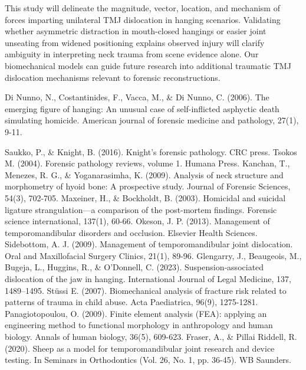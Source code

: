 \documentclass{article}
\begin{document}
This study will delineate the magnitude, vector, location, and mechanism of forces imparting unilateral TMJ dislocation in hanging scenarios. Validating whether asymmetric distraction in mouth-closed hangings or easier joint unseating from widened positioning explains observed injury will clarify ambiguity in interpreting neck trauma from scene evidence alone. Our biomechanical models can guide future research into additional traumatic TMJ dislocation mechanisms relevant to forensic reconstructions.

\clearpage


%

\begin{thebibliography}{10}
Di Nunno, N., Costantinides, F., Vacca, M., \& Di Nunno, C. (2006). The emerging figure of hanging: An unusual case of self-inflicted asphyctic death simulating homicide. American journal of forensic medicine and pathology, 27(1), 9-11.

Saukko, P., \& Knight, B. (2016). Knight's forensic pathology. CRC press.
Tsokos M. (2004). Forensic pathology reviews, volume 1. Humana Press.
Kanchan, T., Menezes, R. G., \& Yoganarasimha, K. (2009). Analysis of neck structure and morphometry of hyoid bone: A prospective study. Journal of Forensic Sciences, 54(3), 702-705.
Maxeiner, H., \& Bockholdt, B. (2003). Homicidal and suicidal ligature strangulation—a comparison of the post-mortem findings. Forensic science international, 137(1), 60-66.
Okeson, J. P. (2013). Management of temporomandibular disorders and occlusion. Elsevier Health Sciences.
Sidebottom, A. J. (2009). Management of temporomandibular joint dislocation. Oral and Maxillofacial Surgery Clinics, 21(1), 89-96.
Glengarry, J., Beaugeois, M., Bugeja, L., Huggins, R., \& O’Donnell, C. (2023). Suspension‐associated dislocation of the jaw in hanging. International Journal of Legal Medicine, 137, 1489–1495.
Stüssi E. (2007). Biomechanical analysis of fracture risk related to patterns of trauma in child abuse. Acta Paediatrica, 96(9), 1275-1281.
Panagiotopoulou, O. (2009). Finite element analysis (FEA): applying an engineering method to functional morphology in anthropology and human biology. Annals of human biology, 36(5), 609-623.
Fraser, A., \& Pillai Riddell, R. (2020). Sheep as a model for temporomandibular joint research and device testing. In Seminars in Orthodontics (Vol. 26, No. 1, pp. 36-45). WB Saunders.
\end{thebibliography}


\end{document}
